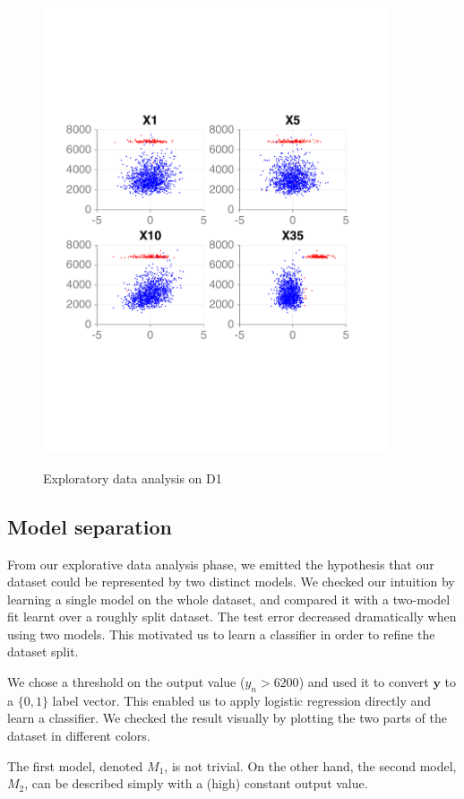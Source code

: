 \documentclass{article} %
\begin{document}
\begin{figure}[ht]
{      \includegraphics[width=4in]{figures/regression/model-separation-rough.pdf}
      \label{fig:regression-model-separation}
    }
    \caption{Exploratory data analysis on D1}
  \end{figure}

  \subsection{Model separation}
  From our explorative data analysis phase, we emitted the hypothesis that our dataset could be represented by two distinct models. We checked our intuition by learning a single model on the whole dataset, and compared it with a two-model fit learnt over a roughly split dataset. The test error decreased dramatically when using two models. This motivated us to learn a classifier in order to refine the dataset split.

  We chose a threshold on the output value ($y_n > 6200$) and used it to convert $\mathbf{y}$ to a $\{0, 1\}$ label vector. This enabled us to apply logistic regression directly and learn a classifier. We checked the result visually by plotting the two parts of the dataset in different colors.

  The first model, denoted $M_1$, is not trivial. On the other hand, the second model, $M_2$, can be described simply with a (high) constant output value.
\end{document}
